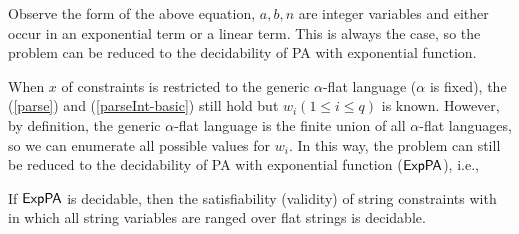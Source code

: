 Observe the form of the above equation,
$a,b,n$ are integer variables and either occur in 
an exponential term or a linear term.
This is always the case,
so the problem can be reduced to 
the decidability of PA with exponential function.

When $x$ of {\parseInt} constraints is restricted to the
generic $\alpha$-flat language ($\alpha$ is fixed),
the (\ref{parse}) and (\ref{parseInt-basic}) still hold 
but $w_i(1\le i\le q)$ is known.
However,
by definition,
the generic $\alpha$-flat language is the finite union of all $\alpha$-flat languages,
so we can enumerate all possible values for $w_i$.
In this way,
the problem can still be reduced to the decidability of PA with exponential function (${\sf ExpPA}$), i.e.,
\begin{theorem} \label{thm:string-parInt}
If {${\sf ExpPA}$} is decidable, then the satisfiability (validity) of string constraints with {\parseInt} in which all string variables 
are ranged over flat strings is decidable. 
\end{theorem}



